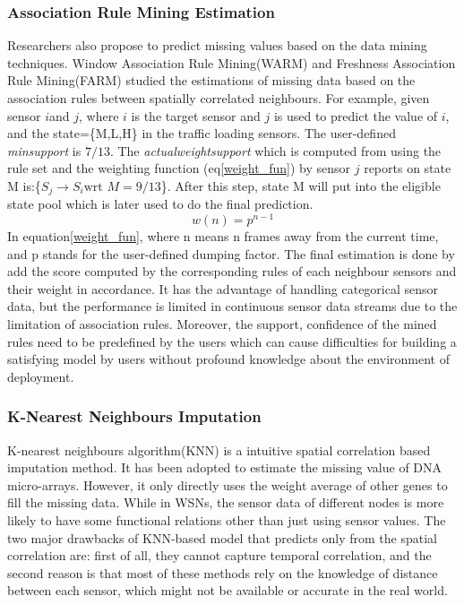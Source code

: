 \subsubsection{Association Rule Mining Estimation}
 Researchers also propose to predict missing values based on the data mining techniques. Window Association Rule Mining(WARM)\cite{le2005estimating} and Freshness Association Rule Mining(FARM)\cite{Gruenwald:FARM} studied the estimations of missing data based on the association rules between spatially correlated neighbours. For example, given sensor $i$and $j$, where $i$ is the target sensor and $j$ is used to predict the value of $i$, and the state=\{M,L,H\} in the traffic loading sensors. The user-defined \textit{minsupport} is $7/13$. The \textit{actualweightsupport} which is computed from using the rule set and the weighting function (eq\ref{weight_fun}) by sensor $j$ reports on state M is:\{$S_{j} \rightarrow S_{i} \mbox{wrt }  M = 9/13$\}. After  this step, state M will put into the eligible state pool which is later used to do the final prediction. 
 \begin{equation}
 w(n) = p^{n-1}
 \label{weight_fun}
\end{equation}
In equation\ref{weight_fun},  where n means n frames away from the current time, and p stands for the user-defined dumping factor. The final estimation is done by add the score computed by the corresponding rules of each neighbour sensors and their weight in accordance.
 It has the advantage of handling categorical sensor data, but the performance is limited in continuous sensor data streams due to the limitation of association rules. Moreover, the support, confidence of the mined rules need to be predefined by the users which can cause difficulties for building a satisfying model by users without profound knowledge about the environment of deployment. 
\subsubsection{K-Nearest Neighbours Imputation} 
 K-nearest neighbours algorithm(KNN) is a intuitive spatial correlation based imputation method. It has been adopted to estimate the missing value of DNA micro-arrays\cite{Troyanskaya:DNAKNN}. However, it only directly uses the weight average of other genes to fill the missing data. While in WSNs, the sensor data of different nodes is more likely to have some functional relations other than just using sensor values. The two major drawbacks of KNN-based model that predicts only from the spatial correlation are: first of all,  they cannot capture temporal correlation, and the second reason is that most of these methods rely on the knowledge of distance between each sensor, which might not be available or accurate in the real world.
